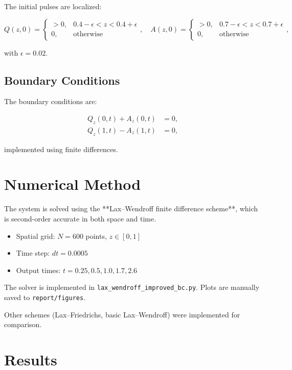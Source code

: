 \documentclass[11pt,a4paper]{article}
\begin{document}
The initial pulses are localized:

\begin{equation}
Q(z,0) =
\begin{cases}
> 0, & 0.4 - \epsilon < z < 0.4 + \epsilon \\
0, & \text{otherwise}
\end{cases}, \quad
A(z,0) =
\begin{cases}
> 0, & 0.7 - \epsilon < z < 0.7 + \epsilon \\
0, & \text{otherwise}
\end{cases},
\end{equation}

with $\epsilon = 0.02$.

\subsection{Boundary Conditions}

The boundary conditions are:

\begin{align}
Q_z(0,t) + A_z(0,t) &= 0, \\
Q_z(1,t) - A_z(1,t) &= 0,
\end{align}

implemented using finite differences.

\section{Numerical Method}

The system is solved using the **Lax--Wendroff finite difference scheme**, which is second-order accurate in both space and time.  

\begin{itemize}
    \item Spatial grid: $N = 600$ points, $z \in [0,1]$
    \item Time step: $dt = 0.0005$
    \item Output times: $t = 0.25, 0.5, 1.0, 1.7, 2.6$
\end{itemize}

The solver is implemented in \texttt{lax\_wendroff\_improved\_bc.py}. Plots are manually saved to \texttt{report/figures}.

Other schemes (Lax--Friedrichs, basic Lax--Wendroff) were implemented for comparison.

\section{Results}
\end{document}
